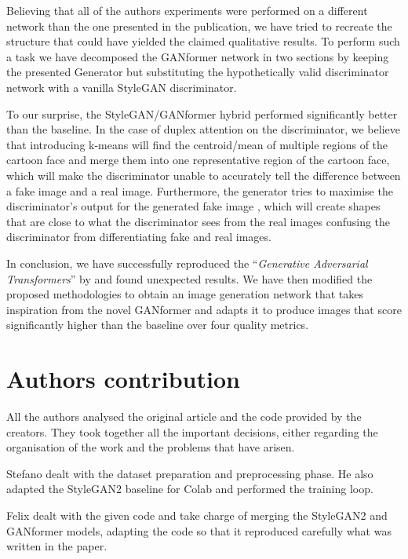 \documentclass{article}
\begin{document}
	
	Believing that all of the authors experiments were performed on a different network than the one 
	presented 
	in the publication, we have tried to recreate the structure that could have yielded the claimed 
	qualitative results.
	To perform such a task we have decomposed the GANformer network in two sections by keeping 
	the presented 
	Generator but substituting the hypothetically valid discriminator network with a vanilla StyleGAN 
	discriminator.
	
	To our surprise, the StyleGAN/GANformer hybrid performed significantly better than the baseline. In 
	the case of duplex attention on the discriminator, we believe that introducing k-means will find the 
	centroid/mean of multiple regions of the cartoon face and merge them into one representative region 
	of the cartoon face, which will make the discriminator unable to accurately tell the difference 
	between a fake image and a real image. Furthermore, the generator tries to maximise the 
	discriminator's output for the generated fake image \cite{gulrajani_improved_2017, 
		arjovsky_wasserstein_2017}, which will create shapes that are close to what the discriminator 
		sees 
	from the real images confusing the discriminator from differentiating fake and real images.
	
	In conclusion, we have successfully reproduced the ``\emph{Generative Adversarial Transformers}'' 
	by \citet{hudson2021generative} and found unexpected results.
	We have then modified the proposed methodologies to obtain an image generation network that 
	takes inspiration from the 
	novel GANformer and adapts it to produce images that score significantly higher than the baseline 
	over four quality metrics.
	
	\section{Authors contribution}
	All the authors analysed the original article and the code provided by the creators. 
	They took together all the important decisions, either regarding the organisation of the work and the 
	problems that have arisen.
	
	Stefano dealt with the dataset preparation and preprocessing phase. He also adapted the StyleGAN2 
	baseline for Colab and performed the training loop.
	
	Felix dealt with the given code and take charge of merging the StyleGAN2 and GANformer models, 
	adapting the code so that it reproduced carefully what was written in the paper.
	
\end{document}
